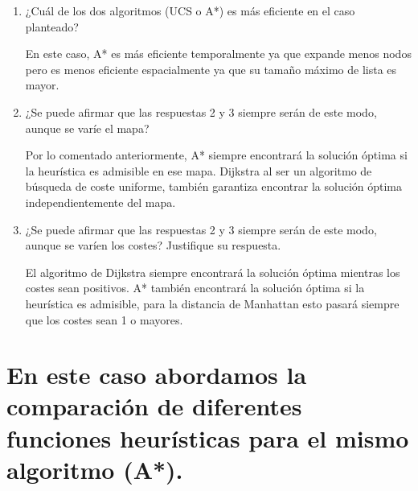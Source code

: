 \documentclass[12pt,a4paper,spanish]{book}
\numberwithin{equation}{chapter}
\numberwithin{figure}{chapter}
\begin{document}
\begin{enumerate}
	\item ¿Cuál de los dos algoritmos (UCS o A*) es más eficiente en el caso planteado?
	
	En este caso, A* es más eficiente temporalmente ya que expande menos nodos pero es menos eficiente espacialmente ya que su tamaño máximo de lista es mayor.
        
	\item ¿Se puede afirmar que las respuestas 2 y 3 siempre serán de este modo, aunque se varíe el mapa?
	
	Por lo comentado anteriormente, A* siempre encontrará la solución óptima si la heurística es admisible en ese mapa. Dijkstra al ser un algoritmo de búsqueda de coste uniforme, también garantiza encontrar la solución óptima independientemente del mapa.
        
	\item ¿Se puede afirmar que las respuestas 2 y 3 siempre serán de este modo, aunque se varíen los costes? Justifique su respuesta.
	
	El algoritmo de Dijkstra siempre encontrará la solución óptima mientras los costes sean positivos. A* también encontrará la solución óptima si la heurística es admisible, para la distancia de Manhattan esto pasará siempre que los costes sean 1 o mayores.
\end{enumerate}

\section{En este caso abordamos la comparación de diferentes funciones heurísticas para el mismo algoritmo (A*).}
\end{document}
